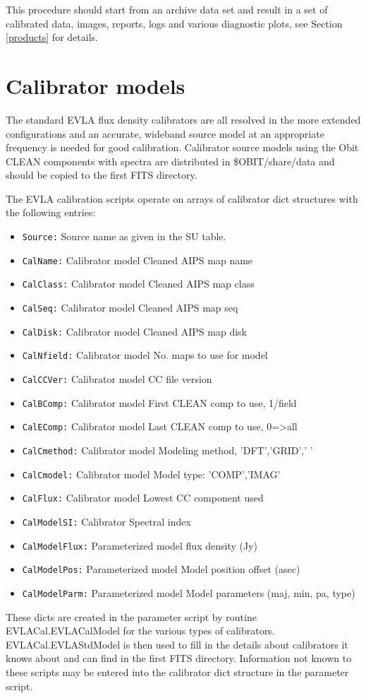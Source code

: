 \documentclass[11pt]{article}
\begin{document}
This procedure should start from an archive data set and result in a
set of calibrated data, images, reports, logs and various diagnostic
plots, see Section \ref{products} for details.
\section{Calibrator models}\label{calmodel}
The standard EVLA flux density calibrators are all resolved in the
more extended configurations and an accurate, wideband source model at
an appropriate frequency is needed for good calibration.
Calibrator source models using the Obit CLEAN components with spectra
are distributed in \$OBIT/share/data and should be copied to the first
FITS directory.

The EVLA calibration scripts operate on arrays of calibrator dict
structures with the following entries:
\begin{itemize}
\item{\tt  Source:}       Source name as given in the SU table. 
\item{\tt  CalName:}      Calibrator model Cleaned AIPS  map name 
\item{\tt  CalClass:}     Calibrator model Cleaned AIPS  map class
\item{\tt  CalSeq:}       Calibrator model Cleaned AIPS  map seq
\item{\tt  CalDisk:}      Calibrator model Cleaned AIPS  map disk
\item{\tt  CalNfield:}    Calibrator model No. maps to use for model
\item{\tt  CalCCVer:}     Calibrator model CC file version
\item{\tt  CalBComp:}     Calibrator model First CLEAN comp to use, 1/field
\item{\tt  CalEComp:}     Calibrator model Last CLEAN comp to use, 0=>all
\item{\tt  CalCmethod:}   Calibrator model Modeling method, 'DFT','GRID','    '
\item{\tt  CalCmodel:}    Calibrator model Model type: 'COMP','IMAG'
\item{\tt  CalFlux:}      Calibrator model Lowest CC component used
\item{\tt  CalModelSI:}   Calibrator Spectral index
\item{\tt  CalModelFlux:} Parameterized model flux density (Jy)
\item{\tt  CalModelPos:}  Parameterized model Model position offset (asec)
\item{\tt  CalModelParm:} Parameterized model Model parameters (maj, min, pa, type)
\end{itemize}
These dicts are created in the parameter script by routine
EVLACal.EVLACalModel for the various types of calibrators.
EVLACal.EVLAStdModel is then used to fill in the details about
calibrators it knows about and can find in the first FITS directory.
Information not known to these scripts may be entered into the
calibrator dict structure in the parameter script.
\end{document}
